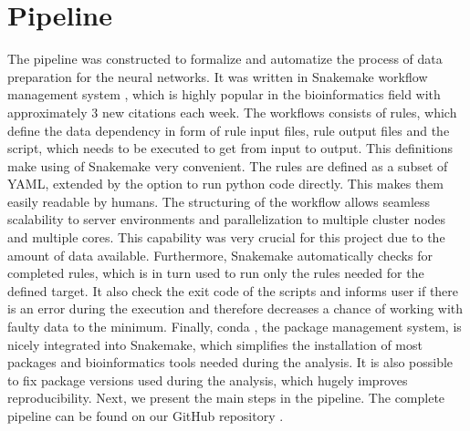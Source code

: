 \section{Pipeline}
The pipeline was constructed to formalize and automatize the process of data preparation for the neural networks.
It was written in Snakemake workflow management system \cite{koster2012snakemake}, which is highly popular in the bioinformatics field with approximately 3 new citations each week.
The workflows consists of rules, which define the data dependency in form of rule input files, rule output files and the script, which needs to be executed to get from input to output. 
This definitions make using of Snakemake very convenient.
The rules are defined as a subset of YAML, extended by the option to run python code directly.
This makes them easily readable by humans.
The structuring of the workflow allows seamless scalability to server environments and parallelization to multiple cluster nodes and multiple cores.
This capability was very crucial for this project due to the amount of data available.
Furthermore, Snakemake automatically checks for completed rules, which is in turn used to run only the rules needed for the defined target.
It also check the exit code of the scripts and informs user if there is an error during the execution and therefore decreases a chance of working with faulty data to the minimum.
Finally, conda \cite{conda}, the package management system, is nicely integrated into Snakemake, which simplifies the installation of most packages and bioinformatics tools needed during the analysis.
It is also possible to fix package versions used during the analysis, which hugely improves reproducibility.
Next, we present the main steps in the pipeline.
The complete pipeline can be found on our GitHub repository \cite{github}.


